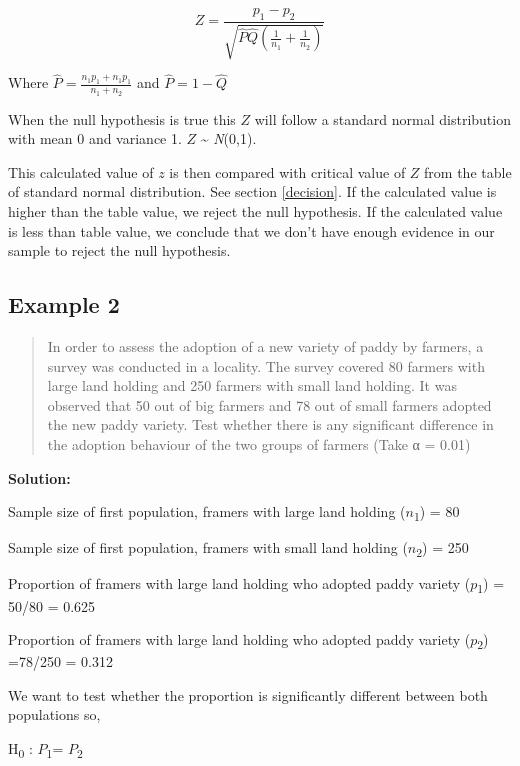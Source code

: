 \documentclass[
]{book}
\begin{document}
\[Z = \frac{p_{1} - p_{2}}{\sqrt{\widehat{P}\widehat{Q}\left( \frac{1}{n_{1}} + \frac{1}{n_{2}} \right)}}\]

Where \(\widehat{P} = \frac{n_{1}p_{1} + n_{1}p_{1}}{n_{1} + n_{2}}\) and
\(\widehat{P} = 1 - \widehat{Q}\)

When the null hypothesis is true this \(Z\) will follow a standard normal distribution with mean 0 and variance 1. \(Z\) \textasciitilde{} \emph{N}(0,1).

This calculated value of \(z\) is then compared with critical
value of \(Z\) from the table of standard normal distribution. See section \ref{decision}. If the calculated value is higher than the table value, we reject the null hypothesis. If the calculated value is less than table value, we conclude that we don't have enough evidence in our sample to reject the null hypothesis.

\hypertarget{example-2-1}{%
\subsection*{Example 2}\label{example-2-1}}

\begin{quote}
In order to assess the adoption of a new variety of paddy by farmers, a survey was conducted in a locality. The survey covered 80 farmers with large land holding and 250 farmers with small land holding. It was observed that 50 out of big farmers and 78 out of small farmers adopted the new paddy variety. Test whether there is any significant difference
in the adoption behaviour of the two groups of farmers (Take α = 0.01)
\end{quote}

\textbf{Solution:}

Sample size of first population, framers with large land holding
(\(n\)\textsubscript{1}) = 80

Sample size of first population, framers with small land holding
(\(n\)\textsubscript{2}) = 250

Proportion of framers with large land holding who adopted paddy variety
(\(p\)\textsubscript{1}) = 50/80 = 0.625

Proportion of framers with large land holding who adopted paddy variety
(\(p\)\textsubscript{2}) =78/250 = 0.312

We want to test whether the proportion is significantly different
between both populations so,

H\textsubscript{0} : \(P\)\textsubscript{1}= \(P\)\textsubscript{2}
\end{document}
